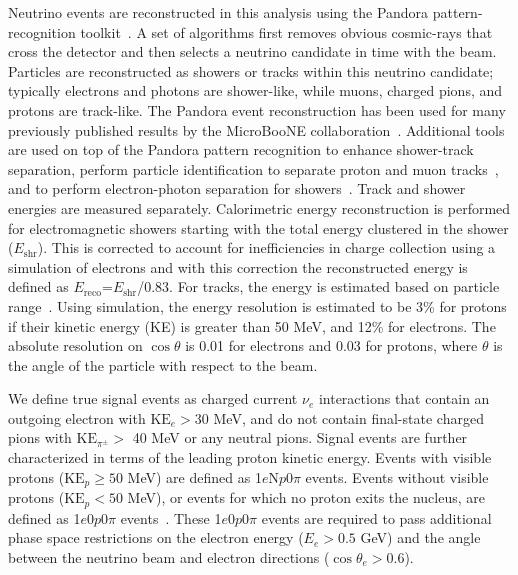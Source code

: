 \documentclass[reprint,
 amsmath,amssymb,
 aps,prd,
 superscriptaddress,
 twocolumn, longbibliography
]{revtex4-1}
\newcommand{\nue}{$\nu_e$\xspace}
\newcommand{\npsel}{1$e$N$p$0$\pi$\xspace}
\newcommand{\zpsel}{1$e$0$p$0$\pi$\xspace}
\newcommand{\ke}{\ensuremath{\textrm{KE}\xspace}}
\begin{document}
Neutrino events are reconstructed in this analysis using the Pandora pattern-recognition toolkit~\cite{pandora}.  A set of algorithms first removes obvious cosmic-rays that cross the detector and then selects a neutrino candidate in time with the beam. Particles are reconstructed as showers or tracks within this neutrino candidate; typically electrons and photons are shower-like, while muons, charged pions, and protons are track-like.  The Pandora event reconstruction has been used for many previously published results by the MicroBooNE collaboration~\cite{gLEE,PeLEE,ubnuminue,ubnuminueMCC9,ubnumunp,ubccqexsec,ubccincl,ubccpi0,ubtrkmult,ubhportal,ubhsl}.  Additional tools are used on top of the Pandora pattern recognition to enhance shower-track separation, perform particle identification to separate proton and muon tracks~\cite{llrpid}, and to perform electron-photon separation for showers~\cite{PeLEE}.
Track and shower energies are measured separately.  Calorimetric energy reconstruction is performed for electromagnetic showers starting with the total energy clustered in the shower ($E_{\textrm{shr}}$).  This is corrected to account for inefficiencies in charge collection using a simulation of electrons and with this correction the reconstructed energy is defined as $E_{\textrm{reco}}$=$E_{\textrm{shr}}$/0.83. For tracks, the energy is estimated based on particle range~\cite{nist}.  Using simulation, the energy resolution is estimated to be 3\% for protons if their kinetic energy (KE) is greater than 50 MeV, and 12\% for electrons.  The absolute resolution on $\cos \theta$ is 0.01 for electrons and 0.03 for protons, where $\theta$ is the angle of the particle with respect to the beam.

We define true signal events as charged current  \nue interactions that contain an outgoing electron with $\textrm{KE}_{e} > 30$ MeV, and do not contain final-state charged pions with $\textrm{KE}_{\pi^{\pm}}>$ 40 MeV or any neutral pions.
Signal events are further characterized in terms of the leading proton kinetic energy.  Events with visible protons ($\ke_{p} \geq 50$ MeV) are defined as \npsel events.  Events without visible protons ($\ke_{p} < 50$ MeV), or events for which no proton exits the nucleus, are defined as \zpsel events~\cite{Suppl}. These \zpsel events are required to pass additional phase space restrictions on the electron energy ($E_e > 0.5$ GeV) and the angle between the neutrino beam and electron directions ($\cos\theta_{e}>0.6$).
\end{document}
